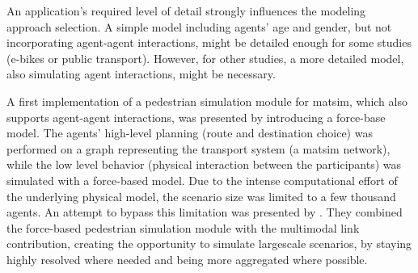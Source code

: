 An application's required level of detail strongly influences the modeling approach selection. A simple model including agents' age and gender, but not incorporating agent-agent interactions, might be detailed enough for some studies (\eg e-bikes or public transport). However, for other studies, a more detailed model, also simulating agent interactions, might be necessary. 

A first implementation of a pedestrian simulation module for \gls{matsim}, which also supports agent-agent interactions, was presented by \citet{00LaemmelPlaue2012CollisionAvoidingModels} introducing a force-base model. The agents' high-level planning (\ie route and destination choice) was performed on a graph representing the transport system (\eg a \gls{matsim} network), while the low level behavior (\ie physical interaction between the participants) was simulated with a force-based model. Due to the intense computational effort of the underlying physical model, the scenario size was limited to a few thousand agents. An attempt to bypass this limitation was presented by \citet{00DoblerLaemmel2012MultiModalEvac}. They combined the force-based pedestrian simulation module with the \gls{multimodal} link contribution, creating the opportunity to simulate \gls{largescale} scenarios, by staying highly resolved where needed and being more aggregated where possible.

